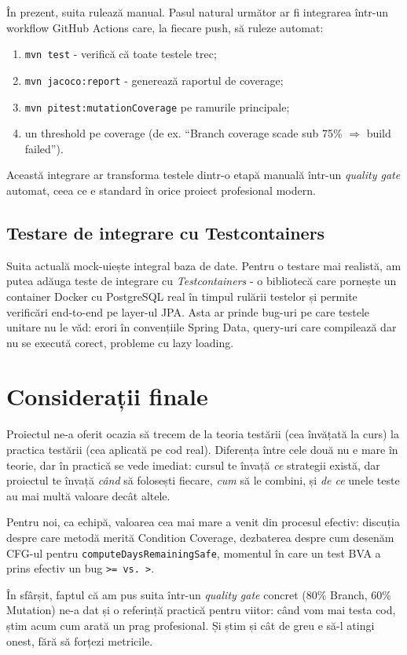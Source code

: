 În prezent, suita rulează manual. Pasul natural următor ar fi integrarea într-un workflow GitHub Actions care, la fiecare push, să ruleze automat:

\begin{enumerate}
    \item \texttt{mvn test} - verifică că toate testele trec;
    \item \texttt{mvn jacoco:report} - generează raportul de coverage;
    \item \texttt{mvn pitest:mutationCoverage} pe ramurile principale;
    \item un threshold pe coverage (de ex. \enquote{Branch coverage scade sub 75\% $\Rightarrow$ build failed}).
\end{enumerate}

Această integrare ar transforma testele dintr-o etapă manuală într-un \textit{quality gate} automat, ceea ce e standard în orice proiect profesional modern.

\subsection{Testare de integrare cu Testcontainers}

Suita actuală mock-uiește integral baza de date. Pentru o testare mai realistă, am putea adăuga teste de integrare cu \textit{Testcontainers} - o bibliotecă care pornește un container Docker cu PostgreSQL real în timpul rulării testelor și permite verificări end-to-end pe layer-ul JPA. Asta ar prinde bug-uri pe care testele unitare nu le văd: erori în convențiile Spring Data, query-uri care compilează dar nu se execută corect, probleme cu lazy loading.

\section{Considerații finale}

Proiectul ne-a oferit ocazia să trecem de la teoria testării (cea învățată la curs) la practica testării (cea aplicată pe cod real). Diferența între cele două nu e mare în teorie, dar în practică se vede imediat: cursul te învață \textit{ce} strategii există, dar proiectul te învață \textit{când} să folosești fiecare, \textit{cum} să le combini, și \textit{de ce} unele teste au mai multă valoare decât altele.

Pentru noi, ca echipă, valoarea cea mai mare a venit din procesul efectiv: discuția despre care metodă merită Condition Coverage, dezbaterea despre cum desenăm CFG-ul pentru \texttt{computeDaysRemainingSafe}, momentul în care un test BVA a prins efectiv un bug \texttt{>= vs. >}.

În sfârșit, faptul că am pus suita într-un \textit{quality gate} concret (80\% Branch, 60\% Mutation) ne-a dat și o referință practică pentru viitor: când vom mai testa cod, știm acum cum arată un prag profesional. Și știm și cât de greu e să-l atingi onest, fără să forțezi metricile.
